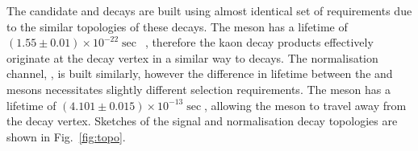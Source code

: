 The candidate \decay{\Bp}{\Dsp\phiz} and \decay{\Bp}{\Dsp\Kp\Km} decays are built using almost identical set of requirements due to the similar topologies of these decays. The \phiz meson has a lifetime of $(1.55\pm0.01)\times10^{-22}\sec$~\cite{PDG2016}, therefore the kaon decay products effectively originate at the \Bp decay vertex in a similar way to \decay{\Bp}{\Dsp\Kp\Km} decays.  The normalisation channel, \decay{\Bp}{\Dsp\Dzb}, is built similarly, however the difference in lifetime between the \Dzb and \phiz mesons necessitates slightly different selection requirements. The \Dzb meson has a lifetime of $(4.101\pm0.015)\times10^{-13}\sec$, allowing the meson to travel away from the \Bp decay vertex. Sketches of the signal and normalisation decay topologies are shown in Fig.~\ref{fig:topo}.

